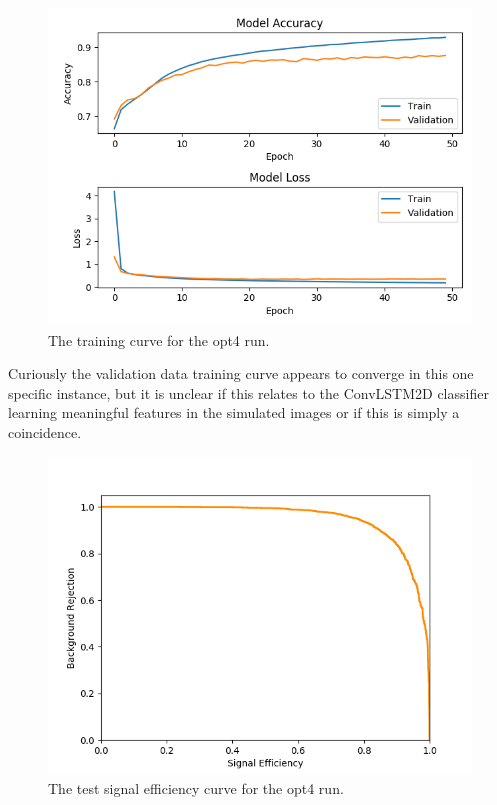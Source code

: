 \begin{figure}[h] 
        \centering \includegraphics[width=\columnwidth]{figures/crabrun2opt4trainlog.png}

        \caption{
                \label{fig:opt4_trainlog} The training curve for the opt4 run.
        }
\end{figure}

Curiously the validation data training curve appears to converge in this one specific instance, but it is unclear if this relates to the ConvLSTM2D classifier learning meaningful features in the simulated images or if this is simply a coincidence. 

\begin{figure}[ht] 
        \centering \includegraphics[width=\columnwidth]{figures/crabrun2opt4_sigeff.png}

        \caption{
                \label{fig:opt4_sigeff} The test signal efficiency curve for the opt4 run.
        }
\end{figure}

